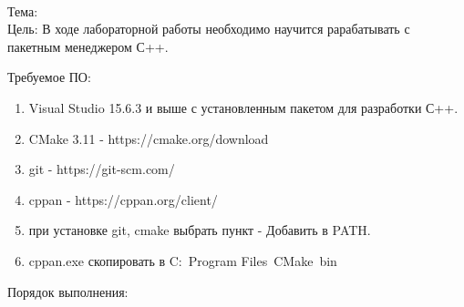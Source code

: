 \begin{center}
{\WorkType}
\\
Тема: {\Topic}
\\
Цель: В ходе лабораторной работы необходимо научится рарабатывать с пакетным менеджером С++. 
\end{center}
Требуемое ПО:
\begin{enumerate}	
\item Visual Studio 15.6.3 и выше с установленным пакетом для разработки С++.\
\item CMake 3.11 - https://cmake.org/download
\item git - https://git-scm.com/
\item cppan - https://cppan.org/client/
\item при установке git, cmake выбрать пункт - Добавить в PATH.
\item cppan.exe скопировать в C:\ Program Files\ CMake\ bin
\end{enumerate}
Порядок выполнения:


